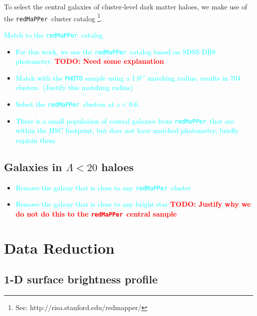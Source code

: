 \documentclass[preprint]{aastex}
\def\arcsec{{\prime\prime}}
\def\redm{\texttt{redMaPPer\ }}
\newcommand{\todo}[1]{\textcolor{red}{\textbf{TODO: #1}}}
\newcommand{\plan}[1]{\textcolor{cyan}{#1}}
\begin{document}
\begin{CJK*}{UTF8}{gbsn}
    To select the central galaxies of cluster-level dark matter haloes, we make use of the 
    \redm cluster catalog \footnote{See: http://risa.stanford.edu/redmapper/}. 
    
    \plan{Match to the \redm catalog}
    \begin{itemize}
        \item \plan{For this work, we use the \redm catalog based on SDSS DR8 
            photometry.} \todo{Need some explanation}
        \item \plan{Match with the \texttt{PHOTO} sample using a 1.0$\arcsec$
            matching radius, results in 704 clusters. (Justify this matching radius)}
        \item \plan{Select the \redm clusters at $z < 0.6$.}
        \item \plan{There is a small population of central galaxies from \redm that
            are within the HSC footprint, but does not have matched photometry, 
            briefly explain them}
    \end{itemize}

\subsection{Galaxies in $\Lambda < 20$ haloes}

    \begin{itemize}
        \item \plan{Remove the galaxy that is close to any \redm cluster}
        \item \plan{Remove the galaxy that is close to any bright star} 
            \todo{Justify why we do not do this to the \redm central sample}
    \end{itemize}
    

\section{Data Reduction}

\subsection{1-D surface brightness profile}


\end{CJK*}
\end{document}
